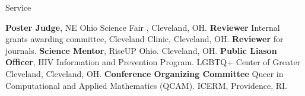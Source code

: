 \begin{rubric}{Service}

\entry*[2022] \textbf{Poster Judge}, NE Ohio Science Fair , Cleveland, OH. 
\entry*[2022] \textbf{Reviewer} Internal grants awarding committee, Cleveland Clinic,  Cleveland, OH.
\entry*[2022-current] \textbf{Reviewer} for journals.
\entry*[2023-current] \textbf{Science Mentor}, RiseUP Ohio. Cleveland, OH.
\entry*[2023-current] \textbf{Public Liason Officer}, HIV Information and Prevention Program. LGBTQ+ Center of Greater Cleveland, Cleveland, OH.
\entry*[-2024] \textbf{Conference Organizing Committee} Queer in Computational and Applied Mathematics (QCAM). ICERM, Providence, RI.
\end{rubric}